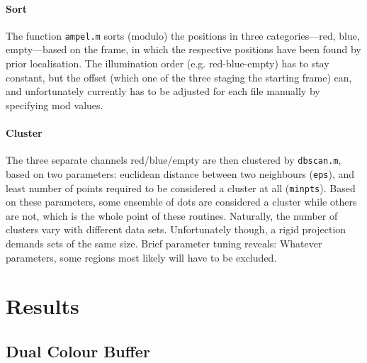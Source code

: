 \documentclass[11pt, a4paper, oneside, twocolumn]{report}
\renewcommand{\tt}{\texttt}
\begin{document}
\subsubsection{Sort}

The function \tt{ampel.m} sorts (modulo) the positions in three
categories---red, blue, empty---based on the frame, in which the
respective positions have been found by prior localisation. The
illumination order (e.g. red-blue-empty) has to stay constant, but the
offset (which one of the three staging the starting frame) can, and
unfortunately currently has to be adjusted for each file manually by
specifying mod values.


\subsubsection{Cluster}

The three separate channels red/blue/empty are then clustered by
\tt{dbscan.m}, based on two parameters: euclidean distance between two
neighbours (\tt{eps}), and least number of points required to be
considered a cluster at all (\tt{minpts}). Based on these parameters,
some ensemble of dots are considered a cluster while others are not,
which is the whole point of these routines. Naturally, the number of
clusters vary with different data sets. Unfortunately though, a rigid
projection demands sets of the same size. Brief parameter tuning
reveals: Whatever parameters, some regions most likely will have to be
excluded.


\clearpage\chapter{Results}


\section{Dual Colour Buffer}
\end{document}
